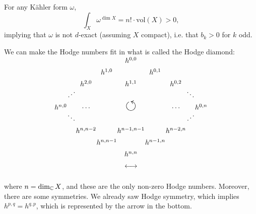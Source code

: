 \begin{remark}
	For any Kähler form $\omega$,
	\[
	\int_X\omega^{\dim X}=n!\cdot\text{vol}(X)>0,
	\]
	implying that $\omega$ is not $d$-exact (assuming $X$ compact), i.e. that $b_k>0$ for $k$ odd.
\end{remark}
%
\begin{remark}
	We can make the Hodge numbers fit in what is called the Hodge diamond:\\
	\[
	\begin{tikzcd}[
		 row sep=1em,
		column sep=0em,
		cells={nodes={inner sep=0.3pt, outer sep=0pt, text height=1.2ex, text depth=0.2ex}},
		cramped
		]
		&&&&h^{0,0}&&&&\\
		&&&h^{1,0}&&h^{0,1}&&&\\
		&&h^{2,0}&&h^{1,1}&&h^{0,2}&&\\
		&\iddots&&&&&&\ddots\\
		h^{n,0}&&\cdots&&\scalebox{2}{$\circlearrowleft$}&&\cdots&&&h^{0,n}\\
		&\ddots&&&&&&\iddots&\\
		&&h^{n,n-2}&&h^{n-1,n-1}&&h^{n-2,n}\\
		&&&h^{n,n-1}&&h^{n-1,n}\\
		&&&&h^{n,n}\\
		&&&&\longleftrightarrow
	\end{tikzcd}
	\]
	\\
	where $n=\dim_\mathbb C X$, and these are the only non-zero Hodge numbers. Moreover, there are some symmetries. We already saw Hodge symmetry, which implies $h^{p,q}=h^{q,p}$, which is represented by the arrow in the bottom. 
	

\end{remark}
